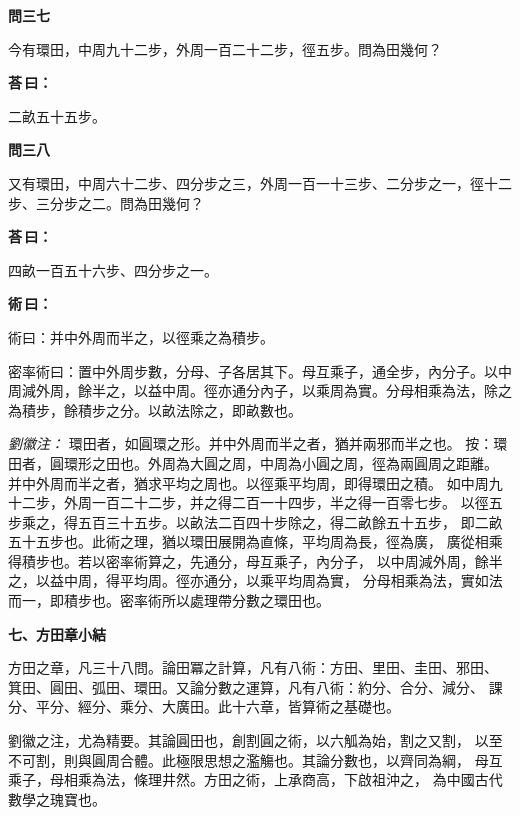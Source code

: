 \documentclass[11pt,a4paper]{article}
\newenvironment{problem}[1][]{%
  \par\vspace{0.6em}\noindent\textcolor{problemcolor}{\textbf{問\ignorespaces#1\unskip}\hspace{0.5em}}%
  \ignorespaces
}{\par\vspace{0.4em}}
\newenvironment{answer}{%
  \par\noindent\textcolor{answercolor}{\textbf{荅\,曰：}}%
  \ignorespaces
}{\par\vspace{0.3em}}
\newenvironment{method}{%
  \par\noindent\textcolor{methodcolor}{\textbf{術\,曰：}}%
  \ignorespaces
}{\par\vspace{0.4em}}
\newenvironment{liuhuicomm}{%
  \par\vspace{0.3em}\noindent\textcolor{commentarycolor}{\small\textit{劉徽注：}}}%
  {\par\vspace{0.5em}}
\begin{document}
\begin{problem}[三七]
今有環田，中周九十二步，外周一百二十二步，徑五步。問為田幾何？
\end{problem}

\begin{answer}
二畝五十五步。
\end{answer}

\begin{problem}[三八]
又有環田，中周六十二步、四分步之三，外周一百一十三步、二分步之一，徑十二步、三分步之二。問為田幾何？
\end{problem}

\begin{answer}
四畝一百五十六步、四分步之一。
\end{answer}

\begin{method}
術曰：并中外周而半之，以徑乘之為積步。

密率術曰：置中外周步數，分母、子各居其下。母互乘子，通全步，內分子。以中周減外周，餘半之，以益中周。徑亦通分內子，以乘周為實。分母相乘為法，除之為積步，餘積步之分。以畝法除之，即畝數也。
\end{method}

\begin{liuhuicomm}
環田者，如圓環之形。并中外周而半之者，猶并兩邪而半之也。
按：環田者，圓環形之田也。外周為大圓之周，中周為小圓之周，徑為兩圓周之距離。
并中外周而半之者，猶求平均之周也。以徑乘平均周，即得環田之積。
如中周九十二步，外周一百二十二步，并之得二百一十四步，半之得一百零七步。
以徑五步乘之，得五百三十五步。以畝法二百四十步除之，得二畝餘五十五步，
即二畝五十五步也。此術之理，猶以環田展開為直條，平均周為長，徑為廣，
廣從相乘得積步也。若以密率術算之，先通分，母互乘子，內分子，
以中周減外周，餘半之，以益中周，得平均周。徑亦通分，以乘平均周為實，
分母相乘為法，實如法而一，即積步也。密率術所以處理帶分數之環田也。
\end{liuhuicomm}

\vspace{0.8em}
\noindent\textbf{\large 七、方田章小結}
\vspace{0.5em}

\begin{quoting}
方田之章，凡三十八問。論田冪之計算，凡有八術：方田、里田、圭田、邪田、
箕田、圓田、弧田、環田。又論分數之運算，凡有八術：約分、合分、減分、
課分、平分、經分、乘分、大廣田。此十六章，皆算術之基礎也。

劉徽之注，尤為精要。其論圓田也，創割圓之術，以六觚為始，割之又割，
以至不可割，則與圓周合體。此極限思想之濫觴也。其論分數也，以齊同為綱，
母互乘子，母相乘為法，條理井然。方田之術，上承商高，下啟祖沖之，
為中國古代數學之瑰寶也。
\end{quoting}
\end{document}
